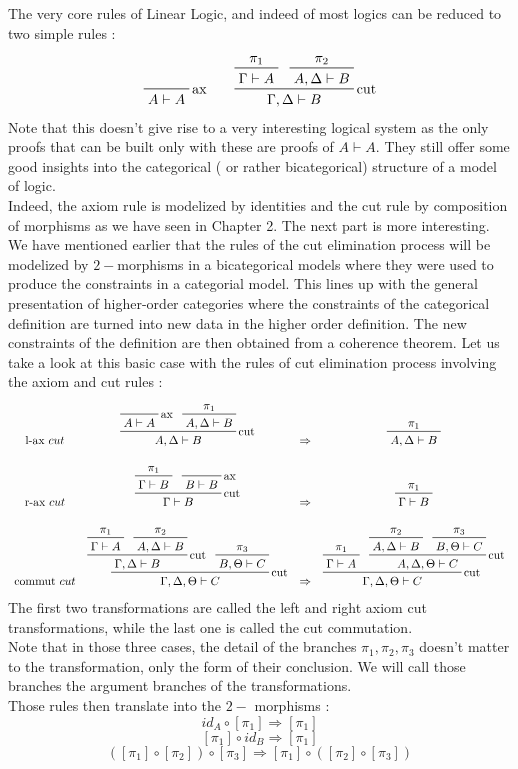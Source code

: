 \documentclass[a4paper, 12pt, twoside,openright]{report}
\begin{document}
The very core rules of Linear Logic, and indeed of most logics can be reduced to two simple rules :  
$$ \begin{array}{ccc}
 \prftree[r]{ax}{A\vdash A}&& 
 \prftree[r]{cut}
	{\prftree{\pi_1}{\Gamma \vdash A}
	}
	{\prftree{\pi_2}{A,\Delta \vdash B}
	}
	{\Gamma,\Delta \vdash B}\\
\end{array}
$$
Note that this doesn't give rise to a very interesting logical system as the only proofs that can be built only with these are proofs of $A \vdash A$. They still offer some good insights into the categorical ( or rather bicategorical) structure of a model of logic. \\
Indeed, the axiom rule is modelized by identities and the cut rule by composition of morphisms as we have seen in Chapter 2. The next part is more interesting. We have mentioned earlier that the rules of the cut elimination process will be modelized by $2-$morphisms in a bicategorical models where they were used to produce the constraints in a categorial model. This lines up with the general presentation of higher-order categories where the constraints of the categorical definition are turned into new data in the higher order definition. The new constraints of the definition are then obtained from a coherence theorem. Let us take a look at this basic case with the rules of cut elimination process involving the axiom and cut rules : 
$$
\begin{array}{cccc}
 \text{l-ax } cut
&
 \prftree[r]{cut}
	{\prftree[r]{ax}
		{A\vdash A}
	}
	{\prftree{\pi_1}{A,\Delta \vdash B}
	}
	{A,\Delta \vdash B}
&
\Rightarrow
&
\prftree{\pi_1}{A,\Delta \vdash B}
\\
\\
\text{r-ax } cut
&
\prftree[r]{cut}
	{\prftree{\pi_1}{\Gamma \vdash B}
	}
	{\prftree[r]{ax}
		{B\vdash B}
	}
	{\Gamma \vdash B}
&
\Rightarrow
&
\prftree{\pi_1}{\Gamma \vdash B}
\\
\\
\text{commut } cut
&
 \prftree[r]{cut}
	{ \prftree[r]{cut}
		{\prftree{\pi_1}{\Gamma \vdash A}
		}
		{\prftree{\pi_2}{A,\Delta \vdash B}
		}
		{\Gamma,\Delta \vdash B}
	}
	{\prftree{\pi_3}{B,\Theta \vdash C}
	}
	{\Gamma,\Delta, \Theta \vdash C}
&
\Rightarrow
&
 \prftree[r]{cut}
	{\prftree{\pi_1}{\Gamma \vdash A}
	}
	{ \prftree[r]{cut}
		{\prftree{\pi_2}{A,\Delta \vdash B}
		}
		{\prftree{\pi_3}{B,\Theta \vdash C}
		}
		{A,\Delta,\Theta \vdash C}
	}
	{\Gamma,\Delta, \Theta \vdash C}
\end{array}
$$
The first two transformations are called the left and right axiom cut transformations, while the last one is called the cut commutation. \\ Note that in those three cases, the detail of the branches $\pi_1,\pi_2,\pi_3$ doesn't matter to the transformation, only the form of their conclusion. We will call those branches the argument branches of the transformations.\\ 
Those rules then translate into the $2-$ morphisms : 
$$id_A \circ [\pi_1] \Rightarrow [\pi_1]$$
$$[\pi_1] \circ id_B \Rightarrow  [\pi_1]$$
$$([\pi_1] \circ  [\pi_2]) \circ  [\pi_3]\Rightarrow  [\pi_1] \circ  ([\pi_2] \circ  [\pi_3])$$
\end{document}
